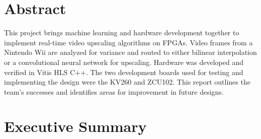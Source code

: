 \documentclass{article}
\begin{document}

\newpage %
\setcounter{page}{1} %

\section*{Abstract} %

\noindent This project brings machine learning and hardware development together to implement real-time video upscaling algorithms on FPGAs. Video frames from a Nintendo Wii are analyzed for variance and routed to either bilinear interpolation or a convolutional neural network for upscaling. Hardware was developed and verified in Vitis HLS C++. The two development boards used for testing and implementing the design were the KV260 and ZCU102. This report outlines the team's successes and identifies areas for improvement in future designs. 

\section*{Executive Summary}
\end{document}
